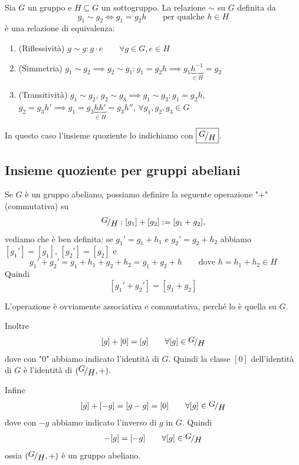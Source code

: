 \documentclass[../main.tex]{subfiles}
\begin{document}
Sia $G$ un gruppo e $H \subseteq G$ un sottogruppo. La relazione $\sim $ su $G$ definita da
\[
    \boxed{
        g_1 \sim g_2 \iff g_1=g_2 h \qquad \text{per qualche } h \in H
    }
\]
è una relazione di equivalenza:
\begin{enumerate}
    \item (Riflessività) $g \sim g : g \cdot e \qquad \forall g \in G, e \in H$
    \item (Simmetria) $g_1 \sim g_2 \implies g_2 \sim g_1 : g_1 = g_2 h \implies g_1 \underbrace{h^{-1}}_{\in H} = g_2$
    \item (Transitività) $g_1 \sim g_2$, $g_2 \sim g_3 \implies g_1 \sim g_3 : g_1 = g_2 h$, $g_2 = g_3 h' \implies g_1 = g_3 \underbrace{h h'}_{\in H} = g_3 h''$, $\forall g_1,g_2,g_3 \in G$
\end{enumerate}
In questo caso l'insieme quoziente lo indichiamo con $\boxed{\nicefrac{G}{H}}$.

\subsection{Insieme quoziente per gruppi abeliani}

Se $G$ è un gruppo abeliano, possiamo definire la seguente operazione "$+$" (commutativa) su
\[
    \nicefrac{G}{H}: [g_1] + [g_2] := [g_1 + g_2],
\]
vediamo che è ben definita:
se $g_{1}' = g_1 + h_1$ e $g_{2}' = g_2 + h_2$ abbiamo $[g_{1}'] = [g_1]$, $[g_{2}'] = [g_2]$ e
\[
    g_{1}' + g_{2}' = g_1 + h_1 + g_2 + h_2 = g_1 + g_2 + h \qquad \text{dove } h = h_1 + h_2 \in H
\]
Quindi
\[
    [g_{1}' + g_{2}'] = [g_1 + g_2]
\]

L'operazione è ovviamente associativa e commutativa, perché lo è quella su $G$.

Inoltre
\[
    [g] + [0] = [g] \qquad \forall [g] \in \nicefrac{G}{H}
\]
dove con "$0$" abbiamo indicato l'identità di $G$. Quindi la classe $[0]$ dell'identità di $G$ è l'identità di $(\nicefrac{G}{H}, +)$.

Infine
\[
    [g] + [-g] = [g-g] = [0] \qquad \forall [g] \in \nicefrac{G}{H}
\]
dove con $-g$ abbiamo indicato l'inverso di $g$ in $G$. Quindi
\[
    -[g] = [-g] \qquad \forall [g] \in \nicefrac{G}{H}
\]
ossia $(\nicefrac{G}{H},+)$ è un gruppo abeliano.
\end{document}
